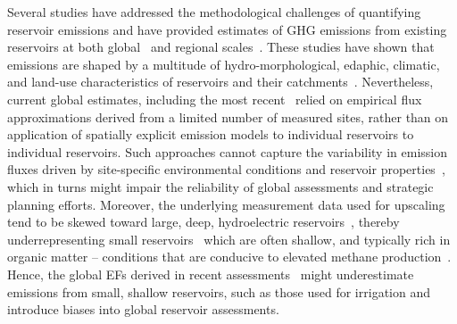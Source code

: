 \documentclass[final,1p,times]{elsarticle}
\begin{document}
Several studies have addressed the methodological challenges of quantifying reservoir emissions and have provided estimates of \ac{GHG} emissions from existing reservoirs at both global~\citep{Barros2011, Soued2022, Deemer2016, Prairie2018, Harrison2021} and regional scales~\citep{Hidrovo2017, Rasanen2018, Almeida2019, Hansen2022}. 
These studies have shown that emissions are shaped by a multitude of hydro-morphological, edaphic, climatic, and land-use characteristics of reservoirs and their catchments~\citep{Deemer2016, Prairie2021}.
Nevertheless, current global estimates, including the most recent~\citep{Harrison2021, Soued2022} relied on empirical flux approximations derived from a limited number of measured sites, rather than on application of spatially explicit emission models to individual reservoirs to individual reservoirs. 
Such approaches cannot capture the variability in emission fluxes driven by site-specific environmental conditions and reservoir properties~\cite{janus2025planning}, which in turns might impair the reliability of global assessments 
and strategic planning efforts. %
Moreover, the underlying measurement data used for upscaling tend to be skewed toward large, deep, hydroelectric reservoirs~\cite{Hansen2022}, thereby underrepresenting small reservoirs~\citep{Malerba2022} which are often shallow, and typically rich in organic matter -- conditions that are conducive to elevated methane production~\citep{WANG2025123441, SHI2025}. 
Hence, the global \acp{EF} derived in recent assessments~\citep{Harrison2021, Soued2022} might underestimate emissions from small, shallow reservoirs, such as those used for irrigation and introduce biases into global reservoir assessments.
\end{document}
